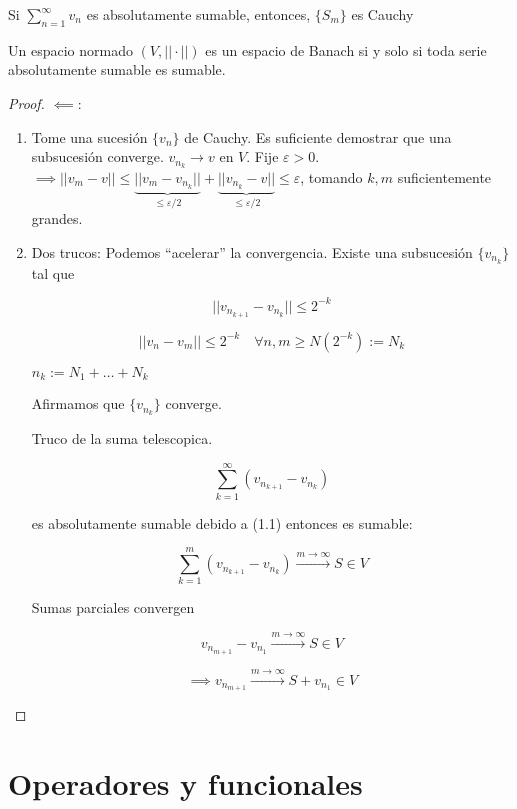 \begin{fproposition}
    Si $\displaystyle\sum_{n=1}^\infty v_n$ es absolutamente sumable, entonces, $\{S_m\}$ es Cauchy
\end{fproposition}

\begin{ftheorem}
    Un espacio normado $(V,||\cdot||)$ es un espacio de Banach si y solo si toda serie absolutamente sumable es sumable.
\end{ftheorem}

\begin{proof}
    $\impliedby:$ \begin{enumerate}
        \item Tome una sucesión $\{v_n\}$ de Cauchy. Es suficiente demostrar que una subsucesión converge. $v_{n_k}\to v$ en $V$. Fije $\varepsilon>0$.
        $\implies ||v_m-v||\leq \underbrace{||v_m-v_{n_k}||}_{\leq \varepsilon/2}+\underbrace{||v_{n_k}-v||}_{\leq \varepsilon/2}\leq \varepsilon$, tomando $k,m$ suficientemente grandes.

        \item Dos trucos: Podemos ``acelerar'' la convergencia. Existe una subsucesión $\{v_{n_k}\}$ tal que 
        
        \begin{equation}||v_{n_{k+1}}-v_{n_k}||\leq 2^{-k}\end{equation}

        \[||v_n-v_m||\leq 2^{-k}\quad \forall n,m\geq N(2^{-k}):=N_k\]

        $n_k:=N_1+\ldots+N_k$

        Afirmamos que $\{v_{n_k}\}$ converge.

        Truco de la suma telescopica.

        \[\sum_{k=1}^\infty (v_{n_{k+1}}-v_{n_k})\]

        es absolutamente sumable debido a (1.1) entonces es sumable:

        \[\sum_{k=1}^m (v_{n_{k+1}}-v_{n_k})\xrightarrow{m\to\infty} S\in V\]

        Sumas parciales convergen 

        \[v_{n_{m+1}}-v_{n_1}\xrightarrow{m\to\infty}S\in V\]

        \[\implies v_{n_{m+1}}\xrightarrow{m\to\infty}S+v_{n_1}\in V\]

    \end{enumerate}
\end{proof}

\section{Operadores y funcionales}

